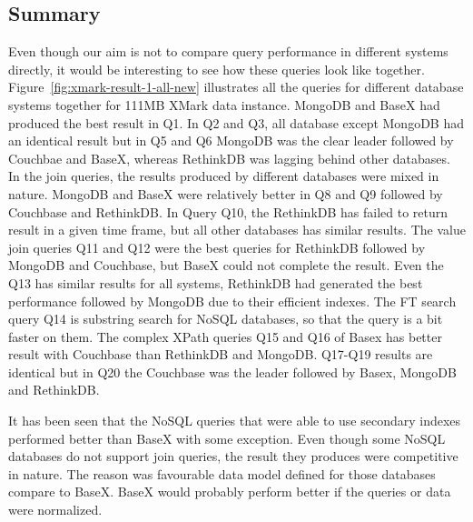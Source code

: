 \subsection{Summary}
Even though our aim is not to compare query performance in different systems directly, it would be interesting to see how these queries look like together. Figure~\ref{fig:xmark-result-1-all-new} illustrates all the queries for different database systems together for 111MB XMark data instance. MongoDB and BaseX had produced the best result in Q1. In Q2 and Q3, all database except MongoDB  had an identical result but in Q5 and Q6 MongoDB was the clear leader followed by Couchbae and BaseX, whereas RethinkDB was lagging behind other databases. In the join queries, the results produced by different databases were mixed in nature. MongoDB and BaseX were relatively better in Q8 and Q9 followed by Couchbase and RethinkDB. In Query Q10, the RethinkDB has failed to return result in a given time frame, but all other databases has similar results. The value join queries Q11 and Q12 were the best queries for RethinkDB followed by MongoDB and Couchbase, but BaseX could not complete the result. Even the Q13 has similar results for all systems, RethinkDB had generated the best performance followed by MongoDB due to their efficient indexes. The FT search query Q14 is substring search for NoSQL databases, so that the query is a bit faster on them. The complex XPath queries Q15 and Q16 of Basex has better result with Couchbase than RethinkDB and MongoDB.
Q17-Q19 results are identical but in Q20 the Couchbase was the leader followed by Basex, MongoDB and RethinkDB. 
\par
It has been seen that the NoSQL queries that were able to use secondary indexes performed better than BaseX with some exception. Even though some NoSQL databases do not support join queries, the result they produces were competitive in nature. The reason was favourable data model defined for those databases compare to BaseX. BaseX would probably perform better if the queries or data were normalized.
